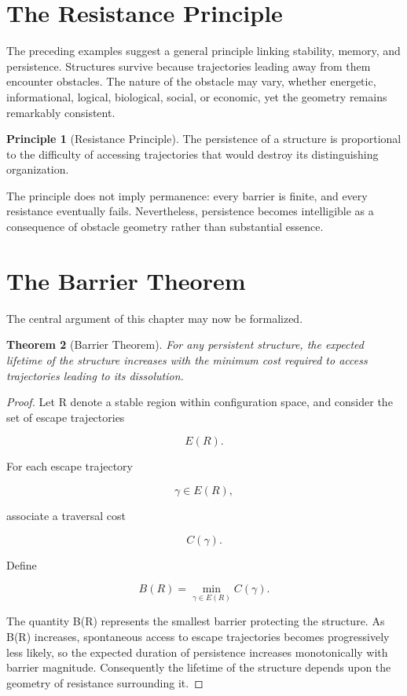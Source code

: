 \documentclass[11pt,oneside]{book}
\theoremstyle{plain}
\newtheorem{theorem}{Theorem}[chapter]
\theoremstyle{definition}
\newtheorem{principle}[theorem]{Principle}
\theoremstyle{remark}
\begin{document}
\section{The Resistance Principle}

The preceding examples suggest a general principle linking stability, memory, and persistence. Structures survive because trajectories leading away from them encounter obstacles. The nature of the obstacle may vary, whether energetic, informational, logical, biological, social, or economic, yet the geometry remains remarkably consistent.

\begin{principle}[Resistance Principle]
The persistence of a structure is proportional to the difficulty of accessing trajectories that would destroy its distinguishing organization.
\end{principle}

The principle does not imply permanence: every barrier is finite, and every resistance eventually fails. Nevertheless, persistence becomes intelligible as a consequence of obstacle geometry rather than substantial essence.

\section{The Barrier Theorem}

The central argument of this chapter may now be formalized.

\begin{theorem}[Barrier Theorem]
For any persistent structure, the expected lifetime of the structure increases with the minimum cost required to access trajectories leading to its dissolution.
\end{theorem}

\begin{proof}
Let R denote a stable region within configuration space, and consider the set of escape trajectories

\begin{equation}
E(R).
\end{equation}

For each escape trajectory

\begin{equation}
\gamma
\in E(R),
\end{equation}

associate a traversal cost

\begin{equation}
C(\gamma).
\end{equation}

Define

\begin{equation}
B(R)
=
\min_{\gamma\in E(R)}
C(\gamma).
\end{equation}

The quantity B(R) represents the smallest barrier protecting the structure. As B(R) increases, spontaneous access to escape trajectories becomes progressively less likely, so the expected duration of persistence increases monotonically with barrier magnitude. Consequently the lifetime of the structure depends upon the geometry of resistance surrounding it.
\end{proof}
\end{document}
